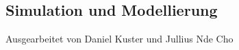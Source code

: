 \documentclass{article}
\begin{document}
\begin{center}
 \section*{Simulation und Modellierung}
 Ausgearbeitet von Daniel Kuster und Jullius Nde Cho
\end{center}
\end{document}
